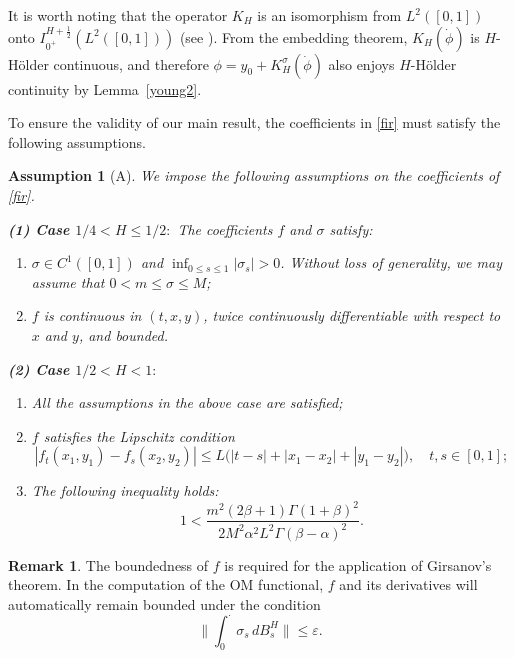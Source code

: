 \documentclass{article}
\theoremstyle{definition}  %
\newtheorem{remark}{Remark}
\theoremstyle{plain}  %
\newtheorem*{assumption}{Assumption}
\begin{document}
It is worth noting that the operator $K_H$ is an isomorphism from $L^2([0,1])$ onto 
$I_{0^+}^{H+\frac{1}{2}}(L^2([0,1]))$ 
(see \cite[Theorem~2.1]{Decreusefond1999}).  
From the embedding theorem, $K_H(\dot{\phi})$ is $H$-H\"older continuous, and therefore $\phi=y_0+K_H^\sigma(\dot{\phi})$ also enjoys $H$-H\"older continuity by Lemma~\ref{young2}.


 To ensure the validity of our main result, the coefficients in \eqref{fir} must satisfy the following assumptions.  
 \begin{assumption}[A]\label{ass:A}
We impose the following assumptions on the coefficients of \eqref{fir}.

\textbf{(1) Case $1/4<H\leq 1/2:$}
The coefficients \(f\) and \(\sigma\) satisfy:
\begin{enumerate}
    \item $\sigma \in C^1([0,1])$ and $\inf_{0 \leq s \leq 1} |\sigma_s| > 0$. 
    Without loss of generality, we may assume that $0 < m \leq \sigma \leq M$;
    \item $f$ is continuous in $(t,x,y)$, twice continuously differentiable with respect to $x$ and $y$, and bounded.
\end{enumerate}

\textbf{(2) Case $1/2<H<1:$}
    \begin{enumerate}
        \item All the assumptions in the above case are satisfied;
         \item $f$ satisfies the Lipschitz condition
        \[
           |f_t(x_1,y_1) - f_s(x_2,y_2)| \leq L \big( |t-s| + |x_1-x_2|+|y_1-y_2| \big),\quad t,s\in[0,1];
        \]
        \item The following inequality holds:
        \begin{equation}\label{assumpT}
              1 < \frac{m^2 (2\beta+1)\Gamma(1+\beta)^2}
                    {2M^2 \alpha^2 L^2 \Gamma(\beta-\alpha)^2}.
        \end{equation}
        
    \end{enumerate}
    

\end{assumption}

\begin{remark}
The boundedness of $f$ is required for the application of Girsanov’s theorem. 
In the computation of the OM functional, $f$ and its derivatives 
will automatically remain bounded under the condition 
\[
\Big\| \int_0^\cdot \sigma_s \, dB^H_s \Big\| \leq \varepsilon.
\]
\end{remark}
\end{document}
